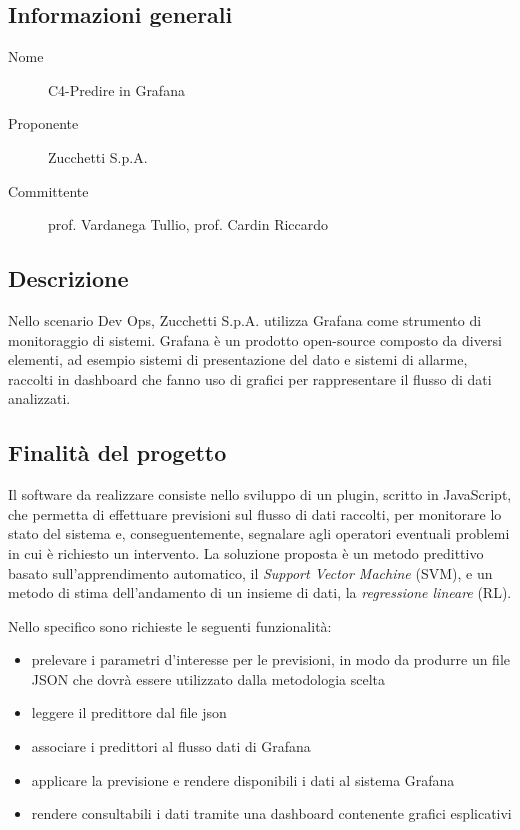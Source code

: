 \documentclass[../studio-di-fattibilita.tex]{subfiles}
\begin{document}
  \subsection{Informazioni generali}%
  \label{subsec:informazioni_generali}
  \begin{description}
    \item[Nome] C4-Predire in Grafana
    \item[Proponente] Zucchetti S.p.A.
    \item[Committente] prof. Vardanega Tullio, prof. Cardin Riccardo
  \end{description}


  \subsection{Descrizione}%
  \label{subsec:descrizione}
  Nello scenario Dev Ops, Zucchetti S.p.A. utilizza Grafana come strumento di monitoraggio di sistemi.
  Grafana è un prodotto open-source composto da diversi elementi, ad esempio sistemi di presentazione del dato e sistemi di allarme, raccolti in dashboard che fanno uso di grafici per rappresentare il flusso di dati analizzati.


  \subsection{Finalità del progetto}%
  \label{subsec:finalita_del_progetto}
  Il software da realizzare consiste nello sviluppo di un plugin, scritto in JavaScript, che permetta di effettuare previsioni sul flusso di dati raccolti,
  per monitorare lo stato del sistema e, conseguentemente, segnalare agli operatori eventuali problemi in cui è richiesto un intervento.
  La soluzione proposta è un metodo predittivo basato sull'apprendimento automatico, il \textit{Support Vector Machine} (SVM),
   e un metodo di stima dell'andamento di un insieme di dati, la \textit{regressione lineare} (RL).

  Nello specifico sono richieste le seguenti funzionalità:
  \begin{itemize}
    \item prelevare i parametri d'interesse per le previsioni, in modo da produrre un file JSON che dovrà essere utilizzato dalla metodologia scelta
    \item leggere il predittore dal file json
    \item associare i predittori al flusso dati di Grafana
    \item applicare la previsione e rendere disponibili i dati al sistema Grafana
    \item rendere consultabili i dati tramite una dashboard contenente grafici esplicativi
  \end{itemize}
\end{document}
